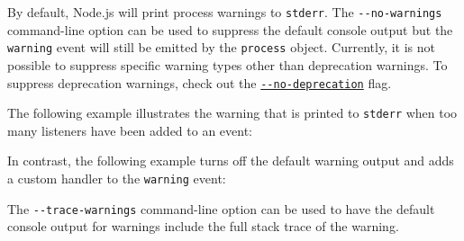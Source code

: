 By default, Node.js will print process warnings to \texttt{stderr}. The
\texttt{-\/-no-warnings} command-line option can be used to suppress the
default console output but the
\texttt{\textquotesingle{}warning\textquotesingle{}} event will still be
emitted by the \texttt{process} object. Currently, it is not possible to
suppress specific warning types other than deprecation warnings. To
suppress deprecation warnings, check out the
\href{cli.md\#--no-deprecation}{\texttt{-\/-no-deprecation}} flag.

The following example illustrates the warning that is printed to
\texttt{stderr} when too many listeners have been added to an event:

\begin{Shaded}
\begin{Highlighting}[]
\end{Highlighting}
\end{Shaded}

In contrast, the following example turns off the default warning output
and adds a custom handler to the
\texttt{\textquotesingle{}warning\textquotesingle{}} event:

\begin{Shaded}
\begin{Highlighting}[]
\end{Highlighting}
\end{Shaded}

The \texttt{-\/-trace-warnings} command-line option can be used to have
the default console output for warnings include the full stack trace of
the warning.

